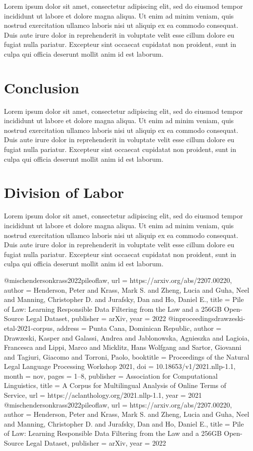 \documentclass[11pt,a4paper]{article}
\begin{document}
Lorem ipsum dolor sit amet, consectetur adipiscing elit, sed do eiusmod tempor incididunt ut labore et dolore magna aliqua. Ut enim ad minim veniam, quis nostrud exercitation ullamco laboris nisi ut aliquip ex ea commodo consequat. Duis aute irure dolor in reprehenderit in voluptate velit esse cillum dolore eu fugiat nulla pariatur. Excepteur sint occaecat cupidatat non proident, sunt in culpa qui officia deserunt mollit anim id est laborum.


\section{Conclusion}
Lorem ipsum dolor sit amet, consectetur adipiscing elit, sed do eiusmod tempor incididunt ut labore et dolore magna aliqua. Ut enim ad minim veniam, quis nostrud exercitation ullamco laboris nisi ut aliquip ex ea commodo consequat. Duis aute irure dolor in reprehenderit in voluptate velit esse cillum dolore eu fugiat nulla pariatur. Excepteur sint occaecat cupidatat non proident, sunt in culpa qui officia deserunt mollit anim id est laborum.


\section{Division of Labor}
Lorem ipsum dolor sit amet, consectetur adipiscing elit, sed do eiusmod tempor incididunt ut labore et dolore magna aliqua. Ut enim ad minim veniam, quis nostrud exercitation ullamco laboris nisi ut aliquip ex ea commodo consequat. Duis aute irure dolor in reprehenderit in voluptate velit esse cillum dolore eu fugiat nulla pariatur. Excepteur sint occaecat cupidatat non proident, sunt in culpa qui officia deserunt mollit anim id est laborum.







@misc{hendersonkrass2022pileoflaw,
  url = {https://arxiv.org/abs/2207.00220},
  author = {Henderson, Peter and Krass, Mark S. and Zheng, Lucia and Guha, Neel and Manning, Christopher D. and Jurafsky, Dan and Ho, Daniel E.},
  title = {Pile of Law: Learning Responsible Data Filtering from the Law and a 256GB Open-Source Legal Dataset},
  publisher = {arXiv},
  year = {2022}
}
@inproceedings{drawzeski-etal-2021-corpus,
  address = {Punta Cana, Dominican Republic},
  author = {Drawzeski, Kasper and Galassi, Andrea and Jablonowska, Agnieszka and Lagioia, Francesca and Lippi, Marco and Micklitz, Hans Wolfgang and Sartor, Giovanni and Tagiuri, Giacomo and Torroni, Paolo},
  booktitle = {Proceedings of the Natural Legal Language Processing Workshop 2021},
  doi = {10.18653/v1/2021.nllp-1.1},
  month = {nov},
  pages = {1--8},
  publisher = {Association for Computational Linguistics},
  title = {{A Corpus for Multilingual Analysis of Online Terms of Service}},
  url = {https://aclanthology.org/2021.nllp-1.1},
  year = {2021}
}
@misc{hendersonkrass2022pileoflaw,
  url = {https://arxiv.org/abs/2207.00220},
  author = {Henderson, Peter and Krass, Mark S. and Zheng, Lucia and Guha, Neel and Manning, Christopher D. and Jurafsky, Dan and Ho, Daniel E.},
  title = {Pile of Law: Learning Responsible Data Filtering from the Law and a 256GB Open-Source Legal Dataset},
  publisher = {arXiv},
  year = {2022}
}
\end{document}
